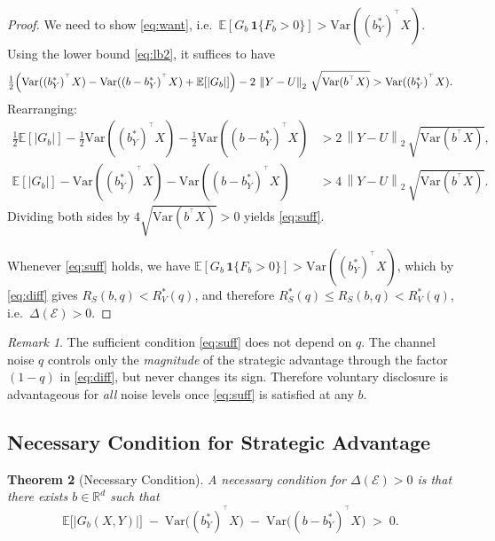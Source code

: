 \documentclass[11pt]{article}
\newtheorem{theorem}{Theorem}[section]
\theoremstyle{definition}
\theoremstyle{remark}
\newtheorem{remark}[theorem]{Remark}
\newcommand{\R}{\mathbb{R}}
\newcommand{\E}{\mathbb{E}}
\newcommand{\norm}[1]{\left\lVert#1\right\rVert}
\newcommand{\T}{^{\top}}
\begin{document}
\begin{proof}
We need to show \eqref{eq:want}, i.e.\
$\E[G_{b}\,\mathbf{1}\{F_{b}>0\}] > \mathrm{Var}((b_{Y}^{*})^{\T}X)$.
Using the lower bound \eqref{eq:lb2}, it suffices to have
\[
  \tfrac{1}{2}\Bigl(\mathrm{Var}((b_{Y}^{*})^{\T}X)
                   -\mathrm{Var}((b-b_{Y}^{*})^{\T}X)
                   +\E[|G_{b}|]\Bigr)
  - 2\,\norm{Y-U}_{2}\,\sqrt{\mathrm{Var}(b^{\T}X)}
  > \mathrm{Var}((b_{Y}^{*})^{\T}X).
\]
Rearranging:
\begin{align*}
  \tfrac{1}{2}\E[|G_{b}|]
  - \tfrac{1}{2}\mathrm{Var}((b_{Y}^{*})^{\T}X)
  - \tfrac{1}{2}\mathrm{Var}((b-b_{Y}^{*})^{\T}X)
  &> 2\,\norm{Y-U}_{2}\,\sqrt{\mathrm{Var}(b^{\T}X)},\\
  \E[|G_{b}|] - \mathrm{Var}((b_{Y}^{*})^{\T}X) - \mathrm{Var}((b-b_{Y}^{*})^{\T}X)
  &> 4\,\norm{Y-U}_{2}\,\sqrt{\mathrm{Var}(b^{\T}X)}.
\end{align*}
Dividing both sides by $4\sqrt{\mathrm{Var}(b^{\T}X)}>0$ yields \eqref{eq:suff}.

Whenever \eqref{eq:suff} holds, we have $\E[G_{b}\,\mathbf{1}\{F_{b}>0\}]>\mathrm{Var}((b_{Y}^{*})^{\T}X)$,
which by \eqref{eq:diff} gives $R_{S}(b,q)<R_{V}^{*}(q)$, and therefore
$R_{S}^{*}(q)\le R_{S}(b,q) < R_{V}^{*}(q)$, i.e.\ $\Delta(\mathcal{E})>0$.
\end{proof}

\begin{remark}
  The sufficient condition \eqref{eq:suff} does not depend on $q$.
  The channel noise $q$ controls only the \emph{magnitude} of the strategic advantage through
  the factor $(1-q)$ in \eqref{eq:diff}, but never changes its sign.
  Therefore voluntary disclosure is advantageous for \emph{all} noise levels once
  \eqref{eq:suff} is satisfied at any $b$.
\end{remark}

\subsection{Necessary Condition for Strategic Advantage}

\begin{theorem}[Necessary Condition]\label{thm:nec}
  A necessary condition for $\Delta(\mathcal{E})>0$ is that there exists $b\in\R^{d}$ such
  that
  \begin{equation}\label{eq:nec}
    \E\!\bigl[|G_{b}(X,Y)|\bigr]
    \;-\;
    \mathrm{Var}\!\bigl((b_{Y}^{*})^{\T}X\bigr)
    \;-\;
    \mathrm{Var}\!\bigl((b-b_{Y}^{*})^{\T}X\bigr)
    \;>\;
    0.
  \end{equation}
\end{theorem}
\end{document}

